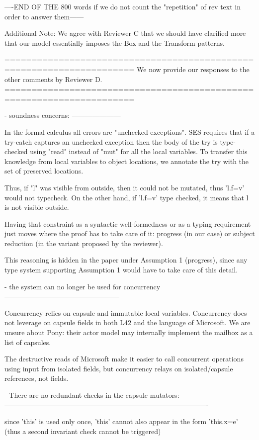 ----END OF THE 800 words if we do not count the "repetition" of rev text in order to answer them------

Additional Note: We agree with Reviewer C that we should have clarified more that our model essentially imposes the Box and the Transform patterns.

======================================================================
We now provide our responses to the other comments by Reviewer D.
======================================================================

- soundness concerns:
---------------------

In the formal calculus all errors are "unchecked exceptions".
SES requires that if a try-catch captures an unchecked exception then the body of the try
is type-checked using "read" instead of "mut" for all the local variables.
To transfer this knowledge from local variables to object locations, we annotate the try with
the set of preserved locations.

Thus, if "l" was visible from outside, then it could not be mutated, thus 'l.f=v' would not typecheck.
On the other hand, if 'l.f=v' type checked, it means that l is not visible outside.

Having that constraint as a syntactic well-formedness or as a typing requirement just moves 
where the proof has to take care of it: progress (in our case) or subject reduction
(in the variant proposed by the reviewer).

This reasoning is hidden in the paper under Assumption 1 (progress), since any type system
supporting Assumption 1 would have to take care of this detail.

- the system can no longer be used for concurrency
--------------------------------------------------

Concurrency relies on capsule and immutable local variables.
Concurrency does not leverage on capsule fields in both L42 and the language of Microsoft.
We are unsure about Pony: their actor model may internally implement the mailbox as a list of capsules.

The destructive reads of Microsoft make it easier to call concurrent operations using input
from isolated fields, but concurrency relays on isolated/capsule references, not fields.


- There are no redundant checks in the capsule mutators:
----------------------------------------------------------------------------------------

 since 'this' is used only once, 'this' cannot also appear in the form 'this.x=e' (thus a second invariant check cannot be triggered)

